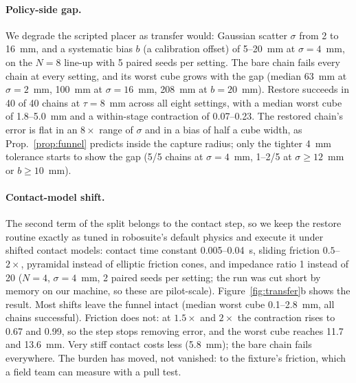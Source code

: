 \documentclass{article}
\begin{document}
\paragraph{Policy-side gap.} We degrade the scripted placer as transfer would: Gaussian scatter $\sigma$ from 2 to
16~mm, and a systematic bias $b$ (a calibration offset) of 5--20~mm at $\sigma=4$~mm, on the $N=8$ line-up with 5
paired seeds per setting. The bare chain fails every chain at every setting, and its worst cube grows with the gap
(median 63~mm at $\sigma=2$~mm, 100~mm at $\sigma=16$~mm, 208~mm at $b=20$~mm). Restore succeeds in 40 of 40 chains at
$\tau=8$~mm across all eight settings, with a median worst cube of 1.8--5.0~mm and a within-stage contraction of
0.07--0.23. The restored chain's error is flat in an $8\times$ range of $\sigma$ and in a bias of half a cube width, as
Prop.~\ref{prop:funnel} predicts inside the capture radius; only the tighter 4~mm tolerance starts to show the gap
(5/5 chains at $\sigma=4$~mm, 1--2/5 at $\sigma\ge12$~mm or $b\ge10$~mm).

\paragraph{Contact-model shift.} The second term of the split belongs to the contact step, so we keep the restore
routine exactly as tuned in robosuite's default physics and execute it under shifted contact models: contact time
constant 0.005--0.04~s, sliding friction $0.5$--$2\times$, pyramidal instead of elliptic friction cones, and
impedance ratio 1 instead of 20 ($N=4$, $\sigma=4$~mm, 2 paired seeds per setting; the run was cut short by memory
on our machine, so these are pilot-scale). Figure~\ref{fig:transfer}b shows the result. Most shifts leave the funnel
intact (median worst cube 0.1--2.8~mm, all chains successful). Friction does not: at $1.5\times$ and $2\times$ the
contraction rises to 0.67 and 0.99, so the step stops removing error, and the worst cube reaches 11.7 and 13.6~mm.
Very stiff contact costs less (5.8~mm); the bare chain fails everywhere. The burden has moved, not vanished: to
the fixture's friction, which a field team can measure with a pull test.
\end{document}
